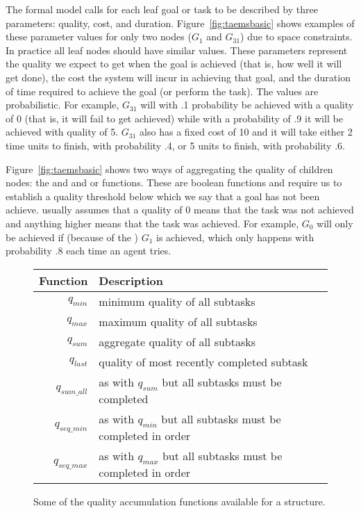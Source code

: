 The \taems{} formal model calls for each leaf goal or task to be
described by three parameters: quality, cost, and duration.
Figure~\ref{fig:taemsbasic} shows examples of these parameter values
for only two nodes ($G_1$ and $G_{31}$) due to space constraints.  In
practice all leaf nodes should have similar values. These parameters
represent the quality we expect to get when the goal is achieved (that
is, how well it will get done), the cost the system will incur in
achieving that goal, and the duration of time required to achieve the
goal (or perform the task). The values are probabilistic. For example,
$G_{31}$ will with .1 probability be achieved with a quality of 0
(that is, it will fail to get achieved) while with a probability of .9
it will be achieved with quality of 5. $G_{31}$ also has a fixed cost
of 10 and it will take either 2 time units to finish, with probability
.4, or 5 units to finish, with probability .6.

Figure~\ref{fig:taemsbasic} shows two ways of aggregating the quality
of children nodes: the and and or functions. These are boolean
functions and require us to establish a quality threshold below which
we say that a goal has not been achieve. \taems{} usually assumes that
a quality of 0 means that the task was not achieved and anything
higher means that the task was achieved. For example, $G_0$ will only
be achieved if (because of the ) $G_1$ is achieved, which
only happens with probability .8 each time an agent tries.


\begin{SCfigure}
  \begin{minipage}{1.0\linewidth}
  \begin{center}
  \begin{tabular}{rl} \toprule
    Function & Description \\ \midrule
    $q_{min}$ & minimum quality of all subtasks \\
    $q_{max}$ & maximum quality of all subtasks \\
    $q_{sum}$ & aggregate quality of all subtasks \\
    $q_{last}$ & quality of most recently completed subtask \\
    $q_{sum\_all}$ & as with $q_{sum}$ but all subtasks must be
    completed \\
    $q_{seq\_min}$ & as with $q_{min}$ but all subtasks must be
    completed in order \\
    $q_{seq\_max}$ & as with $q_{max}$ but all subtasks must be
    completed in order \\ \bottomrule
  \end{tabular}
  \end{center}
  \end{minipage}
  \caption{Some of the quality accumulation functions available for a
    \taems{} structure.}
  \label{tab:qafs}
\end{SCfigure}

